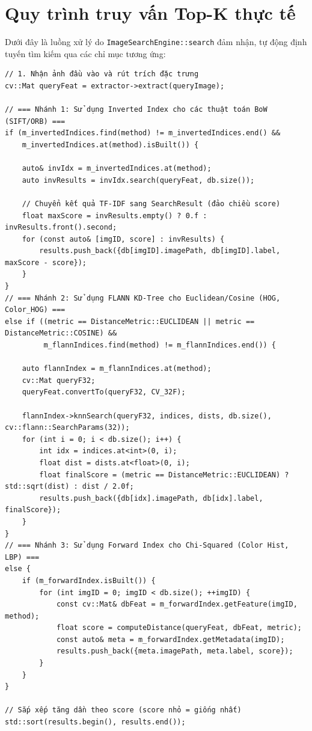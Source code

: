 \section{Quy trình truy vấn Top-K thực tế}
Dưới đây là luồng xử lý do \texttt{ImageSearchEngine::search} đảm nhận, tự động định tuyến tìm kiếm qua các chỉ mục tương ứng:
\begin{verbatim}
// 1. Nhận ảnh đầu vào và rút trích đặc trưng
cv::Mat queryFeat = extractor->extract(queryImage);

// === Nhánh 1: Sử dụng Inverted Index cho các thuật toán BoW (SIFT/ORB) ===
if (m_invertedIndices.find(method) != m_invertedIndices.end() &&
    m_invertedIndices.at(method).isBuilt()) {
    
    auto& invIdx = m_invertedIndices.at(method);
    auto invResults = invIdx.search(queryFeat, db.size());
    
    // Chuyển kết quả TF-IDF sang SearchResult (đảo chiều score)
    float maxScore = invResults.empty() ? 0.f : invResults.front().second;
    for (const auto& [imgID, score] : invResults) {
        results.push_back({db[imgID].imagePath, db[imgID].label, maxScore - score});
    }
}
// === Nhánh 2: Sử dụng FLANN KD-Tree cho Euclidean/Cosine (HOG, Color_HOG) ===
else if ((metric == DistanceMetric::EUCLIDEAN || metric == DistanceMetric::COSINE) &&
         m_flannIndices.find(method) != m_flannIndices.end()) {
         
    auto flannIndex = m_flannIndices.at(method);
    cv::Mat queryF32;
    queryFeat.convertTo(queryF32, CV_32F);
    
    flannIndex->knnSearch(queryF32, indices, dists, db.size(), cv::flann::SearchParams(32));
    for (int i = 0; i < db.size(); i++) {
        int idx = indices.at<int>(0, i);
        float dist = dists.at<float>(0, i);
        float finalScore = (metric == DistanceMetric::EUCLIDEAN) ? std::sqrt(dist) : dist / 2.0f;
        results.push_back({db[idx].imagePath, db[idx].label, finalScore});
    }
}
// === Nhánh 3: Sử dụng Forward Index cho Chi-Squared (Color Hist, LBP) ===
else {
    if (m_forwardIndex.isBuilt()) {
        for (int imgID = 0; imgID < db.size(); ++imgID) {
            const cv::Mat& dbFeat = m_forwardIndex.getFeature(imgID, method);
            float score = computeDistance(queryFeat, dbFeat, metric);
            const auto& meta = m_forwardIndex.getMetadata(imgID);
            results.push_back({meta.imagePath, meta.label, score});
        }
    }
}

// Sắp xếp tăng dần theo score (score nhỏ = giống nhất)
std::sort(results.begin(), results.end());
\end{verbatim}

